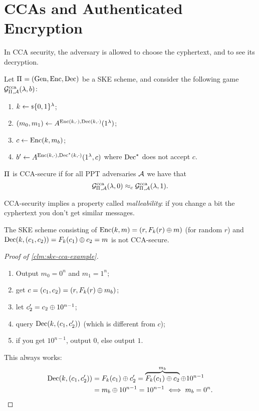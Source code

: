 \section{\aclp{CCA} and Authenticated Encryption}

In \ac{CCA} security, the adversary is allowed to choose the cyphertext, and to see its decryption.

\begin{definition}
	Let $\Pi_{} = \left( \mathrm{Gen} , \allowbreak \mathrm{Enc} , \allowbreak \mathrm{Dec} \right)$ be a \ac{SKE} scheme, and consider the following game $\mathcal{G}^{\scriptstyle \text{cca}}_{\Pi_{},\mathcal{A}}(\lambda, b)$:
	\begin{enumerate}
		\item $k \leftarrow {\scriptstyle \$} {\{0,1\}^{\lambda}}$;
		\item $(m_0, m_1) \leftarrow A^{\mathrm{Enc}(k, \cdot), \mathrm{Dec}(k, \cdot)} (1^{\lambda})$;
		\item $c \leftarrow \mathrm{Enc}(k, m_b)$;
		\item $b' \leftarrow A^{\mathrm{Enc}(k, \cdot), \mathrm{Dec}^{\star}(k, \cdot)} (1^{\lambda}, c)$ where $\mathrm{Dec}^{\star}$ does not accept $c$.
	\end{enumerate}
	$\Pi_{}$ is \ac{CCA}-secure if for all \ac{PPT} adversaries $\mathcal{A}$ we have that
	\begin{equation*}
		\mathcal{G}^{\scriptstyle \text{cca}}_{\Pi_{},\mathcal{A}}(\lambda, 0) \approx_c \mathcal{G}^{\scriptstyle \text{cca}}_{\Pi_{},\mathcal{A}}(\lambda, 1). \qedhere
	\end{equation*}
\end{definition}

\ac{CCA}-security implies a property called \emph{malleability}: if you change a bit the cyphertext you don't get similar messages.

\begin{claim} \label{clm:ske-cca-example}
	The \ac{SKE} scheme consisting of $\mathrm{Enc}(k, m) = (r, F_k(r) \oplus m)$ (for random $r$) and $\mathrm{Dec}(k, (c_1, c_2)) = F_k(c_1) \oplus c_2 = m$ is not \ac{CCA}-secure.
\end{claim}

\begin{proof}[Proof of \cref{clm:ske-cca-example}]
	\begin{enumerate}
		\item Output $m_0 = 0^n$ and $m_1 = 1^n$;
		\item get $c = (c_1, c_2) = (r, F_k(r) \oplus m_b)$;
		\item let $c_2' = c_2 \oplus 10^{n-1}$;
		\item query $\mathrm{Dec}(k, (c_1, c_2'))$ (which is different from $c$);
		\item if you get $10^{n-1}$, output $0$, else output $1$.
	\end{enumerate}
	This always works:
	\begin{align*}
		\mathrm{Dec}(k, (c_1, c_2'))
		& =
		F_k(c_1) \oplus c_2'
		=
		\overbrace{F_k(c_1) \oplus c_2}^{m_b} \oplus 10^{n-1} 
		\\
		& =
		m_b \oplus 10^{n-1}
		= 10^{n-1}
		\iff
		m_b = 0^n.
	\end{align*}
\end{proof}

